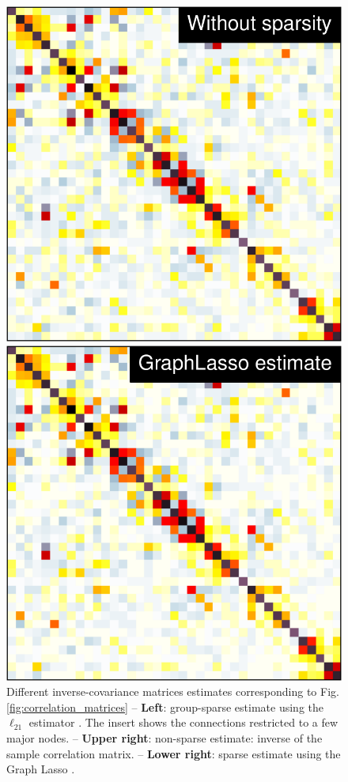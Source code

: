 \documentclass[5p]{elsarticle}
\begin{document}
\begin{figure}
\begin{minipage}{.33\linewidth}%
    \includegraphics[width=\linewidth]{group_emp_prec.pdf}%

    \includegraphics[width=\linewidth]{group_l1_prec.pdf}%
\end{minipage}%

\caption{
Different inverse-covariance matrices estimates corresponding to
Fig.\,\ref{fig:correlation_matrices} -- \textbf{Left}: group-sparse estimate
using the $\ell_{21}$ estimator \cite{varoquaux2010c}.
The insert shows the
connections restricted to a few major nodes. -- \textbf{Upper
right}: non-sparse estimate: inverse of the sample correlation matrix. --
\textbf{Lower right}: sparse estimate using the Graph Lasso
\cite{friedman2008}.
\label{fig:icov_estimators}
}
\end{figure}
\end{document}
